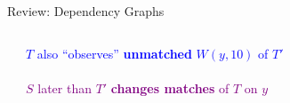 \begin{frame}{Review: Dependency Graphs}
  \begin{columns}[c,onlytextwidth]
    \begin{center}
       \\[1em]
    \end{center}
    \begin{center}
      \small \textcolor{blue}{$T$ also ``observes'' {\bf unmatched} $W(y, 10)$ of $T'$}\\[.5em]
      \\[.5em]
      \small \textcolor{purple}{$S$ later than $T'$ {\bf changes matches} of $T$ on $y$}
    \end{center}
  \end{columns}
\end{frame}

